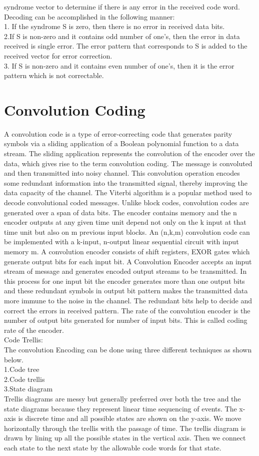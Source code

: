 \documentclass[conference]{IEEEtran}
\begin{document}
syndrome vector to determine if there is any error in the received code word. \\
Decoding can be accomplished in the following manner:\\
1. If the syndrome S is zero, then there is no error in received data bits.\\
2.If  S is non-zero and it contains odd number of one's, then the error in data received is single error. The error pattern that corresponds to S is added to the received vector for error correction.\\
3. If S is non-zero and it contains even number of one's, then it is the error pattern which is not correctable.       
\section{Convolution Coding }
A convolution code is a type of error-correcting code that generates parity symbols via a sliding application of a Boolean polynomial function to a data stream. The sliding application represents the convolution of the encoder over the data, which gives rise to the term convolution coding. The message is convoluted and then transmitted into noisy channel. This convolution operation encodes some redundant information into the transmitted signal, thereby improving the data capacity of the channel. The Viterbi algorithm is a popular method used to decode convolutional coded messages. Unlike block codes, convolution codes are generated over a span of data bits. The encoder contains memory and the n encoder outputs at any given time unit depend not only on the k input at that time unit but also on m previous input blocks. An (n,k,m) convolution code can be implemented with a k-input, n-output linear sequential circuit with input memory m. A convolution encoder consists of shift registers, EXOR gates which generate output bits for each input bit. A Convolution Encoder accepts an input stream of message and generates encoded output streams to be transmitted. In this process for one input bit the encoder generates more than one output bits and these redundant symbols in output bit pattern makes the transmitted data more immune to the noise in the channel. The redundant bits help to decide and correct the errors in received pattern. The rate of the convolution encoder is the number of output bits generated for number of input bits. This is called coding rate of the encoder.\\
Code Trellis:\\
The convolution Encoding can be done using three different techniques as shown below.\\
1.Code tree\\
2.Code trellis\\
3.State diagram\\
Trellis diagrams are messy but generally preferred over both the tree and the state diagrams because they represent linear time sequencing of events. The x-axis is discrete time and all possible states are shown on the y-axis.
We move horizontally through the trellis with the passage of time. The trellis diagram is drawn by lining up all the possible states in the vertical axis. Then we connect each state to the next state by the allowable code words for that state.
\end{document}
